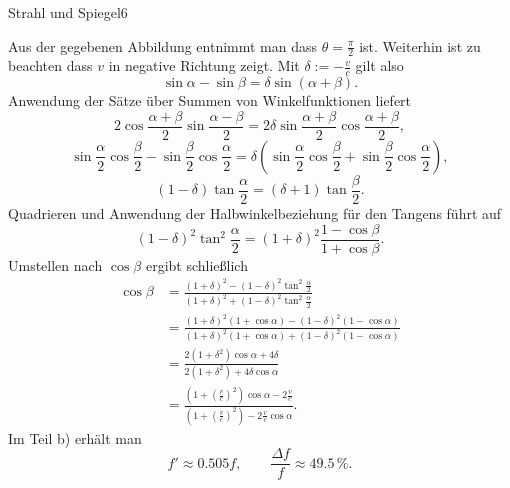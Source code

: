 \begin{problem}{Strahl und Spiegel}{6}
\begin{solution}
Aus der gegebenen Abbildung entnimmt man   dass $\theta=\frac \pi 2$ ist. Weiterhin ist zu beachten dass $v$ in negative Richtung zeigt. Mit $\delta := - \frac vc$ gilt also
\[
\sin\alpha-\sin\beta = \delta\sin(\alpha + \beta).
\]
Anwendung der Sätze über Summen von Winkelfunktionen liefert
\[
2\cos{\frac{\alpha+\beta}2}\sin{\frac{\alpha-\beta}2}=2\delta\sin{\frac{\alpha+\beta}2}\cos{\frac{\alpha+\beta}2},
\]
\[
\sin{\frac{\alpha}2}\cos{\frac{\beta}2}-\sin{\frac{\beta}2}\cos{\frac{\alpha}2} = \delta(\sin{\frac{\alpha}2}\cos{\frac{\beta}2}+\sin{\frac{\beta}2}\cos{\frac{\alpha}2}),
\]
\[
(1-\delta)\tan{\frac{\alpha}2}=(\delta +1)\tan{\frac{\beta}2}.
\]
Quadrieren und Anwendung der Halbwinkelbeziehung für den Tangens führt auf
\[
(1-\delta)^2 \tan^2{\frac{\alpha}2} = (1+\delta)^2 \frac{1-\cos\beta}{1+\cos\beta}.
\]
Umstellen nach $\cos\beta$ ergibt schließlich
\[
\begin{split}
\cos\beta
&= \frac{(1+\delta)^2 - (1-\delta)^2 \tan^2{\frac{\alpha}2}}{(1+\delta)^2+ (1-\delta)^2 \tan^2{\frac{\alpha}2}}\\
&= \frac{(1+\delta)^2 (1+\cos\alpha) - (1-\delta)^2 (1-\cos\alpha)}{(1+\delta)^2 (1+\cos\alpha) + (1-\delta)^2 (1-\cos\alpha)}\\
&= \frac{2(1+\delta^2)\cos\alpha+4\delta}{2(1+\delta^2)+4\delta\cos\alpha}\\
&= \frac{(1+(\frac vc)^2)\cos\alpha - 2\frac vc}{(1+(\frac vc)^2) - 2\frac vc\cos\alpha}.
\end{split}
\]
Im Teil b) erhält man
\[
f' \approx 0.505 f, \qquad \frac{\Delta f}{f} \approx 49.5\,\%.
\]
\end{solution}
\end{problem}

